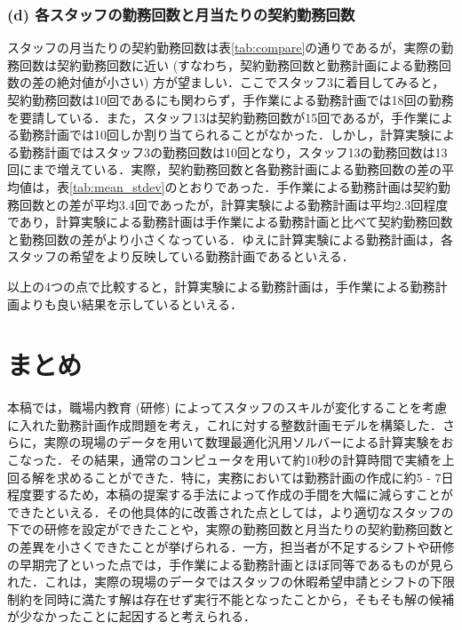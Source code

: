 \documentclass[twocolumn]{jsarticle}
\begin{document}
\subsubsection*{(d) 各スタッフの勤務回数と月当たりの契約勤務回数}
スタッフの月当たりの契約勤務回数は表\ref{tab:compare}の通りであるが，実際の勤務回数は契約勤務回数に近い (すなわち，契約勤務回数と勤務計画による勤務回数の差の絶対値が小さい) 方が望ましい．ここでスタッフ3に着目してみると，契約勤務回数は10回であるにも関わらず，手作業による勤務計画では18回の勤務を要請している．また，スタッフ13は契約勤務回数が15回であるが，手作業による勤務計画では10回しか割り当てられることがなかった．しかし，計算実験による勤務計画ではスタッフ3の勤務回数は10回となり，スタッフ13の勤務回数は13回にまで増えている．実際，契約勤務回数と各勤務計画による勤務回数の差の平均値は，表\ref{tab:mean_stdev}のとおりであった．手作業による勤務計画は契約勤務回数との差が平均3.4回であったが，計算実験による勤務計画は平均2.3回程度であり，計算実験による勤務計画は手作業による勤務計画と比べて契約勤務回数と勤務回数の差がより小さくなっている．ゆえに計算実験による勤務計画は，各スタッフの希望をより反映している勤務計画であるといえる．

\vspace{\baselineskip}
以上の4つの点で比較すると，計算実験による勤務計画は，手作業による勤務計画よりも良い結果を示しているといえる．

\section{まとめ}
本稿では，職場内教育 (研修) によってスタッフのスキルが変化することを考慮に入れた勤務計画作成問題を考え，これに対する整数計画モデルを構築した．さらに，実際の現場のデータを用いて数理最適化汎用ソルバーによる計算実験をおこなった．その結果，通常のコンピュータを用いて約10秒の計算時間で実績を上回る解を求めることができた．特に，実務においては勤務計画の作成に約5 - 7日程度要するため，本稿の提案する手法によって作成の手間を大幅に減らすことができたといえる．その他具体的に改善された点としては，より適切なスタッフの下での研修を設定ができたことや，実際の勤務回数と月当たりの契約勤務回数との差異を小さくできたことが挙げられる．一方，担当者が不足するシフトや研修の早期完了といった点では，手作業による勤務計画とほぼ同等であるものが見られた．これは，実際の現場のデータではスタッフの休暇希望申請とシフトの下限制約を同時に満たす解は存在せず実行不能となったことから，そもそも解の候補が少なかったことに起因すると考えられる．
\end{document}
